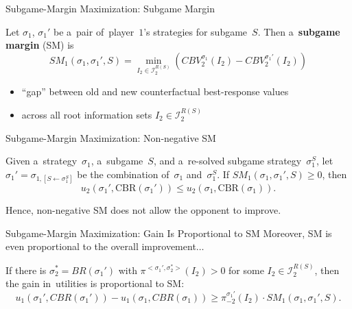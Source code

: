 \documentclass{beamer}
\theoremstyle{definition}
\newcommand{\I}{\mathcal{I}}
\begin{document}
  {
    \begin{frame}{Subgame-Margin Maximization: Subgame Margin}
      \pause
      \begin{framed}
        Let $\sigma_1$, $\sigma_1'$ be a~pair of~player~$1$'s strategies for subgame~$S$.
        Then a~\textbf{subgame margin} (SM) is
        \[
          SM_1 (\sigma_1, \sigma_1' , S) =
          \min_{I_2 \in \I_2^{R(S)}}
          \left( CBV_2^{\sigma_1} (I_2) - CBV_2^{\sigma_1'} (I_2) \right)
        \]
      \end{framed}
      \pause

      \begin{itemize}[<+- | alert@+>]
        \item ``gap'' between old and new counterfactual best-response values
        \item across all root information sets $I_2 \in \I_2^{R(S)}$
      \end{itemize}
    \end{frame}

    \begin{frame}{Subgame-Margin Maximization: Non-negative SM}
      \begin{framed}
        \begin{Theorem}
          Given a~strategy~$\sigma_1$, a~subgame~$S$, and a~re-solved subgame strategy~$\sigma_1^S$, let $\sigma_1' = \sigma_{1, [S \leftarrow \sigma_1^S]}$ be the combination of~$\sigma_1$ and~$\sigma_1^S$.
          If $SM_1 (\sigma_1, \sigma_1' , S) \geq 0$, then
          \[
            u_2(\sigma_1', \textrm{CBR}(\sigma_1')) \leq  u_2(\sigma_1, \textrm{CBR}(\sigma_1)).
          \]
        \end{Theorem}
      \end{framed}
      \pause

      Hence, non-negative SM does not allow the opponent to improve.
    \end{frame}

    \begin{frame}{Subgame-Margin Maximization: Gain Is Proportional to SM}
      Moreover, SM is even proportional to the overall improvement$\ldots$
      \pause
      \begin{framed}
        \begin{theorem}
          If there is $\sigma_2^* = BR(\sigma_1')$ with $\pi^{<\sigma_1',\sigma_2^*>} (I_2) > 0$ for some $I_2 \in\I_2^{R(S)}$, then the gain in~utilities is proportional to SM:
          \[
            u_1(\sigma_1', CBR(\sigma_1')) - u_1(\sigma_1, CBR(\sigma_1)) \ge \pi_{-2}^{\sigma_1'} (I_2) \cdot SM_1(\sigma_1, \sigma_1', S).
          \]
        \end{theorem}
      \end{framed}
      \pause


\end{frame}}
\end{document}
